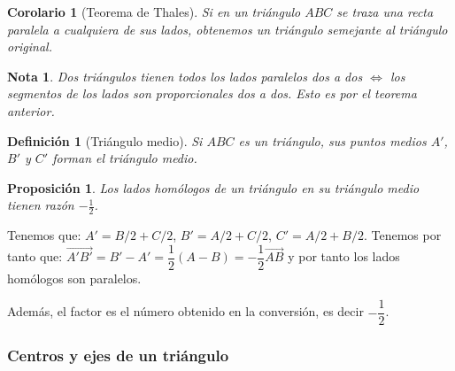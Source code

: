 \documentclass[11pt, a4paper]{article}
\makeatletter
\newif\IfInSansMode
\let\oldsf\sffamily
\renewcommand*{\sffamily}{\oldsf\mathversion{sans}\InSansModetrue}
\let\oldnorm\normalfont
\renewcommand*{\normalfont}{\oldnorm\InSansModefalse\mathversion{normal}}
\renewenvironment{proof}[1][\proofname] {\vspace{-15pt}\par\pushQED{\qed}\normalfont\topsep6\p@\@plus6\p@\relax\trivlist\item[\hskip\labelsep\it#1\@addpunct{.}]\ignorespaces}{\popQED\endtrivlist\@endpefalse}
\renewcommand{\vec}{\overrightarrow}
\renewenvironment{proof}[1][\proofname] {\par\pushQED{\qed}\normalfont\topsep6\p@\@plus6\p@\relax\trivlist\item[\hskip\labelsep\itshape\sffamily#1\@addpunct{.}]\ignorespaces}{\popQED\endtrivlist\@endpefalse}
\theoremstyle{theorem-style}
\newtheorem{nprop}{Proposición}[section]
\newtheorem{ncor}{Corolario}[section]
\theoremstyle{definition-style}
\newtheorem{ndef}{Definición}[section]
\theoremstyle{remark-style}
\newtheorem*{nota}{Nota}
\theoremstyle{example-style}
\makeatother
\begin{document}
\begin{ncor}[Teorema de Thales]
  Si en un triángulo $ABC$ se traza una recta paralela a cualquiera de sus lados, obtenemos un triángulo semejante al triángulo original.
\end{ncor}

\begin{nota}
  Dos triángulos tienen todos los lados paralelos dos a dos $\iff$ los segmentos de los lados son proporcionales dos a dos. Esto es por el teorema anterior.
\end{nota}

\begin{ndef}[Triángulo medio]
  Si $ABC$ es un triángulo, sus puntos medios $A'$, $B'$ y $C'$ forman el \textit{triángulo medio}.
\end{ndef}

\begin{nprop}
  Los lados homólogos de un triángulo en su triángulo medio tienen razón $-\frac{1}{2}$.
\end{nprop}

\begin{proof}
  Tenemos que: $A' = B/2 + C/2$, $B' = A/2+C/2$, $C' = A/2 + B/2$. Tenemos por tanto que: $\vec{A'B'} = B'-A' = \dfrac{1}{2}(A-B) = -\dfrac{1}{2} \vec{AB}$ y por tanto los lados homólogos son paralelos.

      Además, el factor es el número obtenido en la conversión, es decir $-\dfrac{1}{2}$.
\end{proof}

\subsubsection{Centros y ejes de un triángulo}
\end{document}
